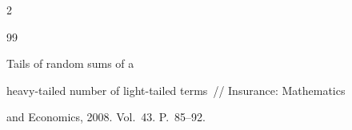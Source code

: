 \begin{multicols}{2}
{{\begin{thebibliography}{99}
\label{end\stat}






   Tails of random sums of a

heavy-tailed number of light-tailed terms~// Insurance: Mathematics

and Economics, 2008. Vol.~43. P.~85--92.

\end{thebibliography}

}

}



\end{multicols}

